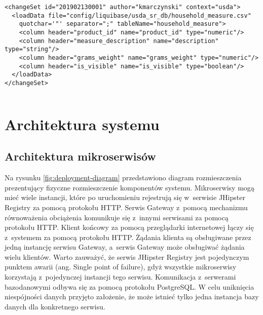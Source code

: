 \noindent\hspace{.075\textwidth}\begin{minipage}{.85\textwidth}
    \begin{verbatim}
<changeSet id="201902130001" author="kmarczynski" context="usda">
  <loadData file="config/liquibase/usda_sr_db/household_measure.csv"
    quotchar='"' separator=";" tableName="household_measure">
    <column header="product_id" name="product_id" type="numeric"/>
    <column header="measure_description" name="description" type="string"/>
    <column header="grams_weight" name="grams_weight" type="numeric"/>
    <column header="is_visible" name="is_visible" type="boolean"/>
  </loadData>
</changeSet>
    \end{verbatim}
    \begin{lstlisting}[caption={Skrpyt ładujący dane z~pliku CSV \source{\ownwork}}, label={listing:liquibase}]
\end{lstlisting}
\end{minipage}

\section{Architektura systemu}\label{sec:system-architecture}
\subsection{Architektura mikroserwisów}\label{subsec:system-architecture:microservices}

Na rysunku \ref{fig:deployment-diagram} przedstawiono diagram rozmieszczenia prezentujący fizyczne rozmieszczenie komponentów systemu.
Mikroserwisy mogą mieć wiele instancji, które po uruchomieniu rejestrują się w~serwisie JHipster Registry za pomocą protokołu HTTP.
Serwis Gateway z~pomocą mechanizmu równoważenia obciążenia komunikuje się z~innymi serwisami za pomocą protokołu HTTP.
Klient końcowy za pomocą przeglądarki internetowej łączy się z~systemem za pomocą protokołu HTTP.
Żądania klienta są obsługiwane przez jedną instancję serwisu Gateway, a~serwis Gateway może obsługiwać żądania wielu klientów.
Warto zauważyć, że serwis JHipster Registry jest pojedynczym punktem awarii (ang. Single point of failure), gdyż wszystkie mikroserwisy korzystają z~pojedynczej instancji tego serwisu.
Komunikacja z~serwerami bazodanowymi odbywa się za pomocą protokołu PostgreSQL.
W celu uniknięcia niespójności danych przyjęto założenie, że może istnieć tylko jedna instancja bazy danych dla konkretnego serwisu.

